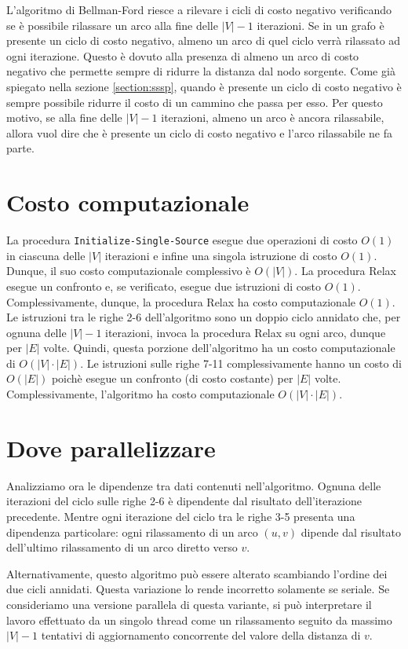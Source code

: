 \documentclass[12pt,a4paper,oneside]{book}
\begin{document}
	L'algoritmo di Bellman-Ford riesce a rilevare i cicli di costo negativo verificando se è possibile rilassare un arco alla fine delle $|V|-1$ iterazioni. Se in un grafo è presente un ciclo di costo negativo, almeno un arco di quel ciclo verrà rilassato ad ogni iterazione. Questo è dovuto alla presenza di almeno un arco di costo negativo che permette sempre di ridurre la distanza dal nodo sorgente. Come già spiegato nella sezione \ref{section:sssp}, quando è presente un ciclo di costo negativo è sempre possibile ridurre il costo di un cammino che passa per esso. Per questo motivo, se alla fine delle $|V|-1$ iterazioni, almeno un arco è ancora rilassabile, allora vuol dire che è presente un ciclo di costo negativo e l'arco rilassabile ne fa parte.

	\section{Costo computazionale}
	La procedura \texttt{Initialize-Single-Source} esegue due operazioni di costo $O(1)$ in ciascuna delle $|V|$ iterazioni e infine una singola istruzione di costo $O(1)$. Dunque, il suo costo computazionale complessivo è $O(|V|)$. La procedura Relax esegue un confronto e, se verificato, esegue due istruzioni di costo $O(1)$. Complessivamente, dunque, la procedura Relax ha costo computazionale $O(1)$. Le istruzioni tra le righe 2-6 dell'algoritmo sono un doppio ciclo annidato che, per ognuna delle $|V|-1$ iterazioni, invoca la procedura Relax su ogni arco, dunque per $|E|$ volte. Quindi, questa porzione dell'algoritmo ha un costo computazionale di $O(|V|\cdot |E|)$. Le istruzioni sulle righe 7-11 complessivamente hanno un costo di $O(|E|)$ poichè esegue un confronto (di costo costante) per $|E|$ volte. Complessivamente, l'algoritmo ha costo computazionale $O(|V|\cdot |E|)$.
	
	\section{Dove parallelizzare}
	Analizziamo ora le dipendenze tra dati contenuti nell'algoritmo. Ognuna delle iterazioni del ciclo sulle righe 2-6 è dipendente dal risultato dell'iterazione precedente. Mentre ogni iterazione del ciclo tra le righe 3-5 presenta una dipendenza particolare: ogni rilassamento di un arco $(u,v)$ dipende dal risultato dell'ultimo rilassamento di un arco diretto verso $v$.
	
	Alternativamente, questo algoritmo può essere alterato scambiando l'ordine dei due cicli annidati. Questa variazione lo rende incorretto solamente se seriale. Se consideriamo una versione parallela di questa variante, si può interpretare il lavoro effettuato da un singolo thread come un rilassamento seguito da massimo $|V|-1$ tentativi di aggiornamento concorrente del valore della distanza di $v$.
	
\end{document}
